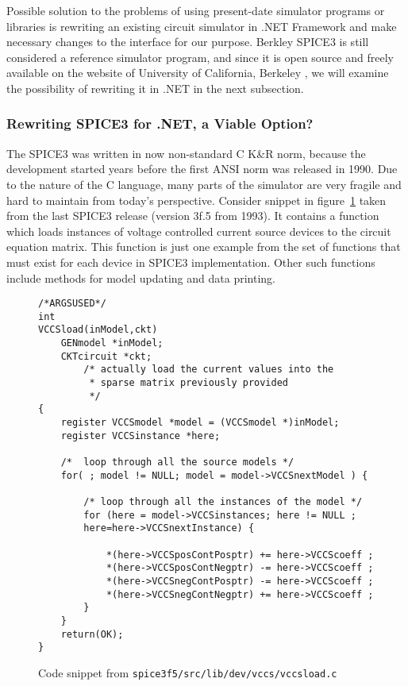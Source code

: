 Possible solution to the problems of using present-date simulator programs or libraries is rewriting an existing circuit simulator in .NET Framework and make necessary changes to the interface for our purpose. Berkley SPICE3 is still considered a reference simulator program, and since it is open source and freely available on the website of University of California, Berkeley \cite{spice3f5}, we will examine the possibility of rewriting it in .NET in the next subsection.

\subsubsection*{Rewriting SPICE3 for .NET, a Viable Option?}

The SPICE3 was written in now non-standard C K\&R norm, because the development started years before the first ANSI norm was released in 1990. Due to the nature of the C language, many parts of the simulator are very fragile and hard to maintain from today's perspective. Consider snippet in figure~\ref{fig:vccs_snippet} taken from the last SPICE3 release (version 3f.5 from 1993). It contains a function which loads instances of voltage controlled current source devices to the circuit equation matrix. This function is just one example from the set of functions that must exist for each device in SPICE3 implementation. Other such functions include methods for model updating and data printing.

\begin{figure}[h]
	\begin{verbatim}
/*ARGSUSED*/
int
VCCSload(inModel,ckt)
	GENmodel *inModel;
	CKTcircuit *ckt;
		/* actually load the current values into the 
		 * sparse matrix previously provided 
		 */
{
	register VCCSmodel *model = (VCCSmodel *)inModel;
	register VCCSinstance *here;
	
	/*  loop through all the source models */
	for( ; model != NULL; model = model->VCCSnextModel ) {
		
		/* loop through all the instances of the model */
		for (here = model->VCCSinstances; here != NULL ;
		here=here->VCCSnextInstance) {
			
			*(here->VCCSposContPosptr) += here->VCCScoeff ;
			*(here->VCCSposContNegptr) -= here->VCCScoeff ;
			*(here->VCCSnegContPosptr) -= here->VCCScoeff ;
			*(here->VCCSnegContNegptr) += here->VCCScoeff ;
		}
	}
	return(OK);
}
	\end{verbatim}
	\caption{Code snippet from \texttt{spice3f5/src/lib/dev/vccs/vccsload.c}}
	\label{fig:vccs_snippet}
\end{figure}

